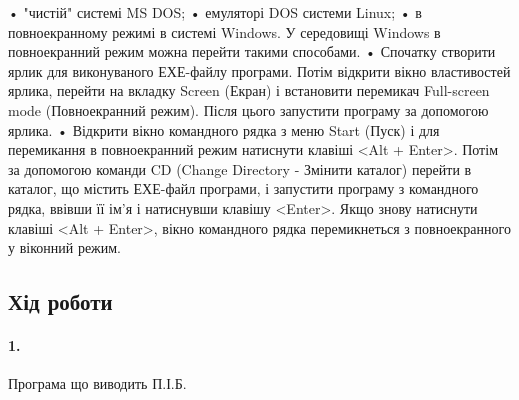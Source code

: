 \documentclass[12pt]{extarticle}
\begin{document}
• "чистій" системі MS DOS;
• емуляторі DOS системи Linux;
• в повноекранному режимі в системі Windows.
У середовищі Windows в повноекранний режим можна перейти такими
способами.
• Спочатку створити ярлик для виконуваного ЕХЕ-файлу програми. Потім
відкрити вікно властивостей ярлика, перейти на вкладку Screen (Екран) і
встановити перемикач Full-screen mode (Повноекранний режим). Після цього
запустити програму за допомогою ярлика.
• Відкрити вікно командного рядка з меню Start (Пуск) і для перемикання
в повноекранний режим натиснути клавіші <Alt + Enter>. Потім за допомогою
команди CD (Change Directory - Змінити каталог) перейти в каталог, що містить
ЕХЕ-файл програми, і запустити програму з командного рядка, ввівши її ім'я і
натиснувши клавішу <Enter>. Якщо знову натиснути клавіші <Alt + Enter>, вікно
командного рядка перемикнеться з повноекранного у віконний режим.


\subsection*{Хід роботи}

\paragraph{1.}Програма що виводить П.І.Б.
\end{document}
